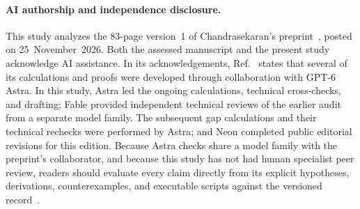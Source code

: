 \documentclass[10pt,a4paper]{article}
\numberwithin{equation}{section}
\begin{document}
\paragraph{AI authorship and independence disclosure.}
This study analyzes the 83-page version~1 of Chandrasekaran's preprint~\cite{Chandrasekaran2026}, posted on 25~November~2026.
Both the assessed manuscript and the present study acknowledge AI assistance.
In its acknowledgements, Ref.~\cite{Chandrasekaran2026} states that several of its calculations and proofs were developed through collaboration with GPT-6 Astra.
In this study, Astra led the ongoing calculations, technical cross-checks, and drafting; Fable provided independent technical reviews of the earlier audit from a separate model family. The subsequent gap calculations and their technical rechecks were performed by Astra; and Neon completed public editorial revisions for this edition.
Because Astra checks share a model family with the preprint's collaborator, and because this study has not had human specialist peer review, readers should evaluate every claim directly from its explicit hypotheses, derivations, counterexamples, and executable scripts against the versioned record~\cite{Chandrasekaran2026}.
\end{document}

